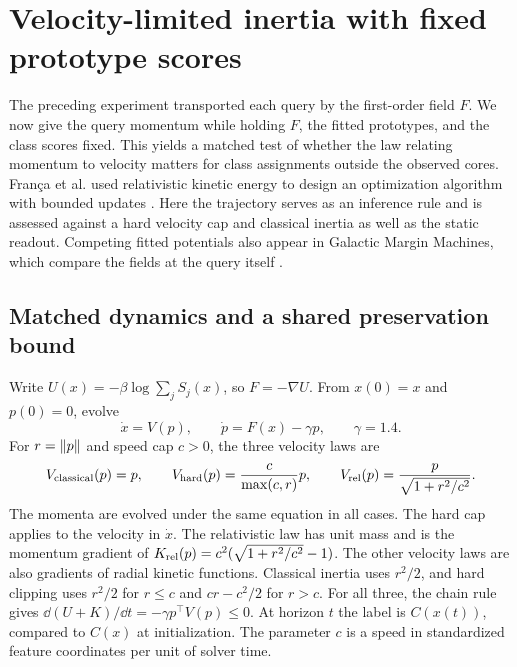 \section{Velocity-limited inertia with fixed prototype scores}
\label{sec:inertia}

The preceding experiment transported each query by the first-order field $F$.
We now give the query momentum while holding $F$, the fitted prototypes, and
the class scores fixed. This yields a matched test of whether the law relating
momentum to velocity matters for class assignments outside the observed cores.
Fran\c{c}a et al. used relativistic kinetic energy to design an optimization
algorithm with bounded updates \cite{franca}. Here the trajectory serves as
an inference rule and is assessed against a hard velocity cap and classical
inertia as well as the static readout. Competing fitted potentials also appear
in Galactic Margin Machines, which compare the fields at the query itself
\cite{behnood}.

\subsection{Matched dynamics and a shared preservation bound}

Write $U(x)=-\beta\log\sum_j S_j(x)$, so $F=-\nabla U$. From $x(0)=x$ and
$p(0)=0$, evolve
\begin{equation}
  \dot x=V(p),\qquad \dot p=F(x)-\gamma p,\qquad \gamma=1.4 .
  \label{eq:inertial-state}
\end{equation}
For $r=\lVert p\rVert$ and speed cap $c>0$, the three velocity laws are
\begin{equation}
  V_{\rm classical}(p)=p,\qquad
  V_{\rm hard}(p)=\frac{c}{\max(c,r)}p,\qquad
  V_{\rm rel}(p)=\frac{p}{\sqrt{1+r^2/c^2}} .
  \label{eq:inertial-velocities}
\end{equation}
The momenta are evolved under the same equation in all cases. The hard cap
applies to the velocity in $\dot x$. The relativistic law has unit mass and is
the momentum gradient of $K_{\rm rel}(p)=c^2(\sqrt{1+r^2/c^2}-1)$. The other
velocity laws are also gradients of radial kinetic functions. Classical
inertia uses $r^2/2$, and hard clipping uses $r^2/2$ for $r\le c$ and
$cr-c^2/2$ for $r>c$. For all three, the chain rule gives
$\dd(U+K)/\dd t=-\gamma p^\top V(p)\le 0$. At horizon $t$ the label is
$C(x(t))$, compared to $C(x)$ at initialization. The parameter $c$ is a
speed in standardized feature coordinates per unit of solver time.


